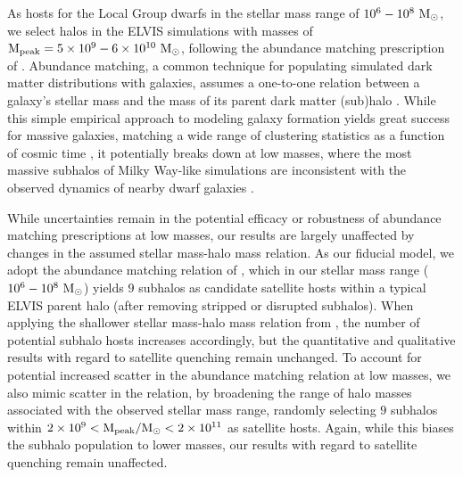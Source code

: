As hosts for the Local Group dwarfs in the stellar mass range of
$10^{6}-10^{8}~{\rm M}_{\odot}$, we select halos in the ELVIS simulations with
masses of ${\rm M}_{\rm peak} = 5\times10^{9}-6\times10^{10}~{\rm M}_{\odot}$,
following the abundance matching prescription of
\citet{gk14}. Abundance matching, a common technique for populating
simulated dark matter distributions with galaxies, assumes a
one-to-one relation between a galaxy's stellar mass and the mass of
its parent dark matter (sub)halo \citep{behroozi13, moster13}. While
this simple empirical approach to modeling galaxy formation yields
great success for massive galaxies, matching a wide range of
clustering statistics as a function of cosmic time
\citep[e.g.][]{berrier06, conroy06}, it potentially breaks down at low
masses, where the most massive subhalos of Milky Way-like simulations
are inconsistent with the observed dynamics of nearby dwarf galaxies
\citep{bk11, bk12, gk14b, kirby14, tollerud14}.


While uncertainties remain in the potential efficacy or robustness of
abundance matching prescriptions at low masses, our results are
largely unaffected by changes in the assumed stellar mass-halo mass
relation. As our fiducial model, we adopt the abundance matching
relation of \citet{gk14}, which in our stellar mass range ($10^{6} -
10^{8}~{\rm M}_{\odot}$) yields $9$ subhalos as candidate satellite hosts within
a typical ELVIS parent halo (after removing stripped or disrupted
subhalos). When applying the shallower stellar mass-halo mass relation
from \citet{behroozi13}, the number of potential subhalo hosts
increases accordingly, but the quantitative and qualitative results
with regard to satellite quenching remain unchanged. To account for
potential increased scatter in the abundance matching relation at low
masses, we also mimic scatter in the \citet{gk14} relation, by
broadening the range of halo masses associated with the observed
stellar mass range, randomly selecting $9$ subhalos within $2 \times
10^{9} < {\rm M}_{\rm peak}/{\rm M}_{\odot} < 2 \times 10^{11}$ as satellite
hosts. Again, while this biases the subhalo population to lower
masses, our results with regard to satellite quenching remain
unaffected.


